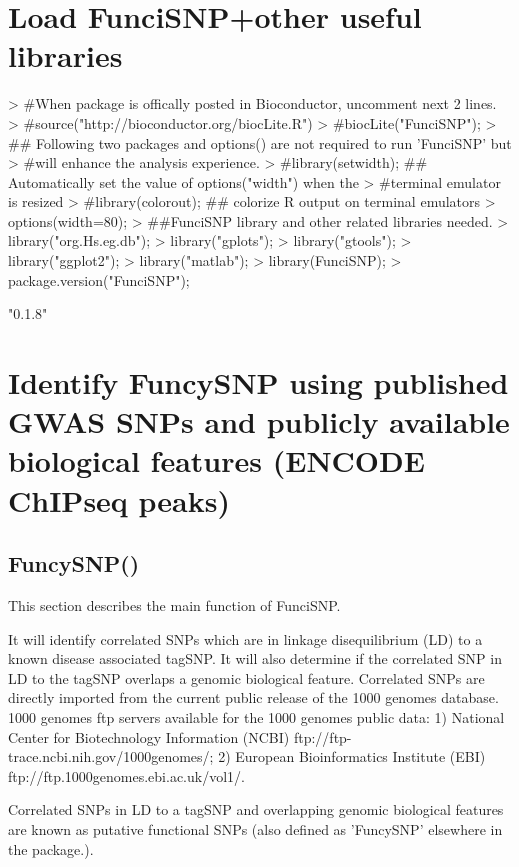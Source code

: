 \documentclass[a4paper]{article}
\begin{document}
\section*{Load FunciSNP+other useful libraries}
\begin{Schunk}
\begin{Sinput}
> #When package is offically posted in Bioconductor, uncomment next 2 lines.
> #source("http://bioconductor.org/biocLite.R")
> #biocLite("FunciSNP");
> ## Following two packages and options() are not required to run 'FunciSNP' but 
> #will enhance the analysis experience.
> #library(setwidth); ## Automatically set the value of options("width") when the 
> #terminal emulator is resized
> #library(colorout); ## colorize R output on terminal emulators
> options(width=80);
> ##FunciSNP library and other related libraries needed.
> library("org.Hs.eg.db");
> library("gplots");
> library("gtools");
> library("ggplot2");
> library("matlab");
> library(FunciSNP);
> package.version("FunciSNP");
\end{Sinput}
\begin{Soutput}
[1] "0.1.8"
\end{Soutput}
\end{Schunk}

\section*{Identify FuncySNP using published GWAS SNPs and publicly available 
biological features (ENCODE ChIPseq peaks)}
\subsection*{FuncySNP()}
This section describes the main function of FunciSNP. 

It will identify correlated SNPs which are in linkage disequilibrium (LD) 
to a known disease associated tagSNP. It will also determine if the 
correlated SNP in LD to the tagSNP overlaps a genomic biological feature. 
Correlated SNPs are directly imported from the current public release of 
the 1000 genomes database. 1000 genomes ftp servers available for the 
1000 genomes public data: 1) National Center for Biotechnology Information 
(NCBI) ftp://ftp-trace.ncbi.nih.gov/1000genomes/; 2) European Bioinformatics
Institute (EBI) ftp://ftp.1000genomes.ebi.ac.uk/vol1/.

Correlated SNPs in LD to a tagSNP and overlapping genomic biological features 
are known as putative functional SNPs (also defined as 'FuncySNP' elsewhere in
 the package.).
\end{document}
